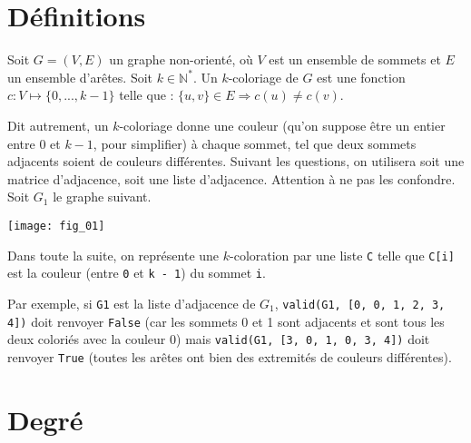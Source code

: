 
\section*{Définitions}
Soit $G = (V, E)$ un graphe non-orienté, où $V$ est un ensemble de sommets et $E$ un ensemble d’arêtes. Soit $k\in\mathbb{N}^*$. Un
$k$-coloriage de $G$ est une fonction $c : V \mapsto \{0, ..., k - 1\}$ telle que :
$\{u, v\} \in E\Rightarrow c(u) \neq c(v)$.

Dit autrement, un $k$-coloriage donne une couleur (qu’on suppose être un entier entre 0 et $k-1$, pour simplifier) à chaque sommet,
tel que deux sommets adjacents soient de couleurs différentes.
Suivant les questions, on utilisera soit une matrice d’adjacence, soit une liste d’adjacence. Attention à ne pas les confondre.
Soit $G_1$ le graphe suivant.
\begin{center}
\texttt{[image: fig\_01]}
\end{center}




Dans toute la suite, on représente une $k$-coloration par une liste \lstinline{C} telle que \lstinline{C[i]} est la couleur (entre \lstinline{0} et \lstinline{k - 1})
du sommet \lstinline{i}.


Par exemple, si \lstinline{G1} est la liste d’adjacence de $G_1$, \lstinline{valid(G1, [0, 0, 1, 2, 3, 4])} doit renvoyer \lstinline{False} (car les sommets
0 et 1 sont adjacents et sont tous les deux coloriés avec la couleur 0) mais \lstinline{valid(G1, [3, 0, 1, 0, 3, 4])} doit renvoyer
\lstinline{True} (toutes les arêtes ont bien des extremités de couleurs différentes).



\section*{Degré}


